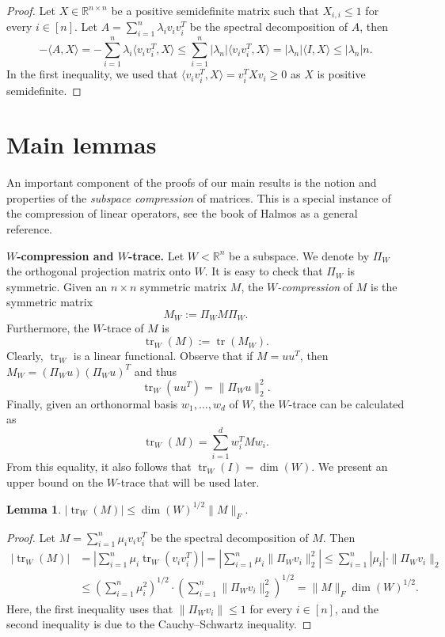 \documentclass[11pt]{article}
\theoremstyle{plain}
\newtheorem{lemma}[theorem]{Lemma}
\theoremstyle{definition}
\DeclareMathOperator{\trace}{tr}
\begin{document}
\begin{proof}
Let $X\in \mathbb{R}^{n\times n}$ be a positive semidefinite matrix such that $X_{i,i}\leq 1$ for every $i\in [n]$. Let $A=\sum_{i=1}^n\lambda_iv_iv_i^T$ be the spectral decomposition of $A$, then 
$$ -\langle A,X\rangle 
    =-\sum_{i=1}^n \lambda_i\langle v_iv_i^T,X\rangle
    \leq \sum_{i=1}^n |\lambda_n| \langle v_iv_i^T,X\rangle=|\lambda_n|\langle I,X\rangle\leq |\lambda_n|n.$$
In the first inequality, we used that $\langle v_iv_i^T,X\rangle=v_i^T X v_i \ge 0$ as $X$ is positive semidefinite.
\end{proof}

\section{Main lemmas}\label{sect:main_lemmas}

An important component of the proofs of our main results is the notion and properties of the \emph{subspace compression} of matrices. This is a special instance of the compression of linear operators, see the book of Halmos \cite{Halmos} as a general reference.

\medskip

\noindent
\textbf{$W$-compression and $W$-trace.} Let $W<\mathbb{R}^n$ be a subspace. 
We denote by $\Pi_{W}$ the orthogonal projection matrix onto $W$.  
It is easy to check that $\Pi_W$ is symmetric.
Given an $n\times n$ symmetric matrix $M$, the \emph{$W$-compression} of $M$ is the symmetric matrix $$M_W:=\Pi_{W}M\Pi_{W}.$$ Furthermore, the $W$-trace of $M$ is
$$\trace_W(M):=\trace(M_W).$$
Clearly, $\trace_W$ is a linear functional. Observe that if $M=uu^T$, then $M_W=(\Pi_Wu)(\Pi_Wu)^T$ and thus 
$$\trace_W(u u^T)=\|\Pi_Wu\|_2^2.$$ Finally, given an orthonormal basis $w_1,\dots,w_d$ of $W$, the $W$-trace can be calculated as 
$$\trace_W(M)=\sum_{i=1}^d w_i^TMw_i.$$
From this equality, it also follows that $\trace_W(I)=\dim(W)$. 
We present an upper bound on the $W$-trace that will be used later.

\begin{lemma}\label{lemma:W-trace_bound}
$|\trace_W(M)|\leq \dim(W)^{1/2}\|M\|_F.$
\end{lemma}

\begin{proof}
Let $M=\sum_{i=1}^n\mu_i v_iv_i^T$ be the spectral decomposition of $M$. Then 
\begin{align*}
|\trace_W(M)|&=\left|\sum_{i=1}^n\mu_i \trace_W(v_iv_i^T)\right|=\left|\sum_{i=1}^n\mu_i \|\Pi_W v_i\|_2^2\right|\leq \sum_{i=1}^n|\mu_i|\cdot \|\Pi_W v_i\|_2\\
&\leq \left(\sum_{i=1}^n \mu_i^2\right)^{1/2}\cdot \left(\sum_{i=1}^n \|\Pi_W v_i\|_2^2\right)^{1/2}= \|M\|_F\dim(W)^{1/2}.
\end{align*}
Here, the first inequality uses that $\|\Pi_W v_i\|\leq 1$ for every $i\in [n]$, and the second inequality is due to the Cauchy--Schwartz inequality.
\end{proof}
\end{document}
